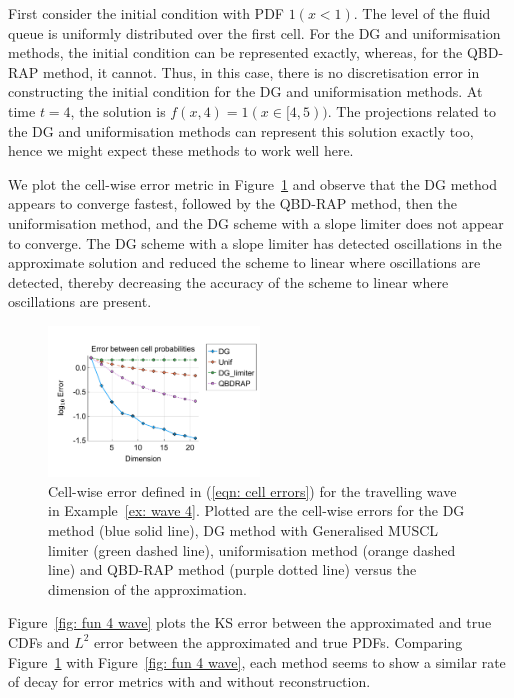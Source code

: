 \begin{example}\label{ex: wave 4}
First consider the initial condition with PDF \(1(x<1)\). The level of the fluid queue is uniformly distributed over the first cell. For the DG and uniformisation methods, the initial condition can be represented exactly, whereas, for the QBD-RAP method, it cannot. Thus, in this case, there is no discretisation error in constructing the initial condition for the DG and uniformisation methods. At time \(t=4\), the solution is \(f(x,4)=1(x\in[4,5))\). The projections related to the DG and uniformisation methods can represent this solution exactly too, hence we might expect these methods to work well here. 

We plot the cell-wise error metric in Figure~\ref{fig: fun 4 wave cp} and observe that the DG method appears to converge fastest, followed by the QBD-RAP method, then the uniformisation method, and the DG scheme with a slope limiter does not appear to converge. The DG scheme with a slope limiter has detected oscillations in the approximate solution and reduced the scheme to linear where oscillations are detected, thereby decreasing the accuracy of the scheme to linear where oscillations are present. 
\begin{figure}[h]
	\centering
	\includegraphics[width=0.5\textwidth,trim={0.75cm 0.8cm 0.25cm 1.25cm},clip]{chapter6/figs/wave/fun4/L1_cell_probs.pdf}
	\caption{Cell-wise error defined in (\ref{eqn: cell errors}) for the travelling wave in Example~\ref{ex: wave 4}. Plotted are the cell-wise errors for the DG method (blue solid line), DG method with Generalised MUSCL limiter (green dashed line), uniformisation method (orange dashed line) and QBD-RAP method (purple dotted line) versus the dimension of the approximation.}
	\label{fig: fun 4 wave cp} 
\end{figure}

Figure~\ref{fig: fun 4 wave} plots the KS error between the approximated and true CDFs and \(L^2\) error between the approximated and true PDFs. Comparing Figure~\ref{fig: fun 4 wave cp} with Figure~\ref{fig: fun 4 wave}, each method seems to show a similar rate of decay for error metrics with and without reconstruction. 


\end{example}
